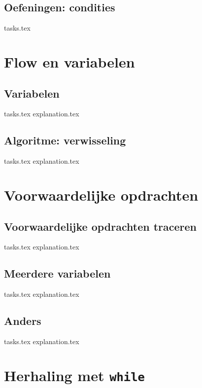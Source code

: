 \documentclass[b5paper,openright,twoside]{report}
\begin{document}
    \section{Oefeningen: condities}
    {tasks.tex}          \newpage \mbox{} \newpage

    \chapter{Flow en variabelen}
    \newpage

    \section{Variabelen}
    {tasks.tex}           \newpage
    {explanation.tex}     \newpage

    \section{Algoritme: verwisseling}
    {tasks.tex}                \newpage
    {explanation.tex}          \newpage

    \chapter{Voorwaardelijke opdrachten}
    \newpage

    \section{Voorwaardelijke opdrachten traceren}
    {tasks.tex}          \newpage
    {explanation.tex}    \newpage

    \section{Meerdere variabelen}
    {tasks.tex}           \newpage
    {explanation.tex}     \newpage

    \section{Anders}
    {tasks.tex}                \newpage
    {explanation.tex}          \newpage

    \chapter{Herhaling met \texttt{while}}
    \newpage
\end{document}
